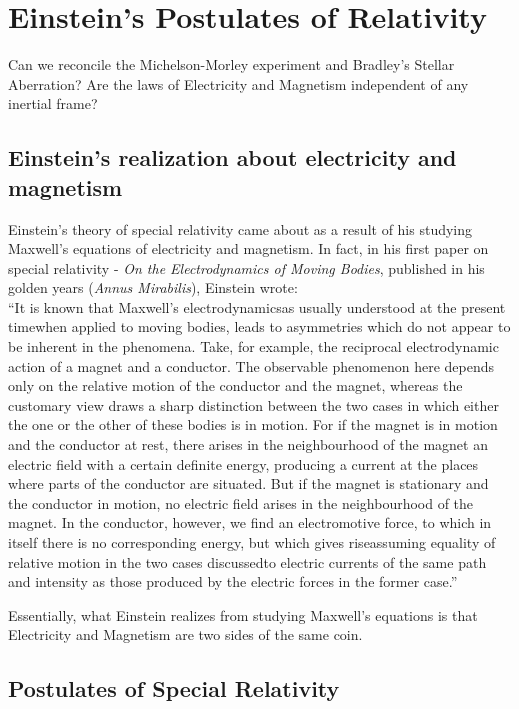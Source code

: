 \documentclass[a4paper,11pt]{article}
\numberwithin{equation}{section}
\begin{document}
 \newpage
 
 \section{Einstein's Postulates of Relativity}
 Can we reconcile the Michelson-Morley experiment and Bradley's Stellar Aberration? Are the laws of Electricity and Magnetism independent of any inertial frame?
 \subsection{Einstein's realization about electricity and magnetism}
 \indent Einstein's theory of special relativity came about as a result of his studying Maxwell's equations of electricity and magnetism. In fact, in his first paper on special relativity - \textit{On the Electrodynamics of Moving Bodies}, published in his golden years (\textit{Annus Mirabilis}), Einstein wrote:\smallskip\\
 \indent ``It is known that Maxwell\textquoteright s electrodynamics\textemdash as usually understood at the present time\textemdash when applied to moving bodies, leads to asymmetries which do not appear to be inherent in the phenomena. Take, for example, the reciprocal electrodynamic action of a magnet and a conductor. The observable phenomenon here depends only on the relative motion of the conductor and the magnet, whereas the customary view draws a sharp distinction between the two cases in which either the one or the other of these bodies is in motion. For if the magnet is in motion and the conductor at rest, there arises in the neighbourhood of the magnet an electric field with a certain definite energy, producing a current at the places where parts of the conductor are situated. But if the magnet is stationary and the conductor in motion, no electric field arises in the neighbourhood of the magnet. In the conductor, however, we find an electromotive force, to which in itself there is no corresponding energy, but which gives rise\textemdash assuming equality of relative motion in the two cases discussed\textemdash to electric currents of the same path and intensity as those produced by the electric forces in the former case.''
 
 \noindent Essentially, what Einstein realizes from studying Maxwell's equations is that Electricity and Magnetism are two sides of the same coin.
 
 \subsection{Postulates of Special Relativity}
\end{document}
